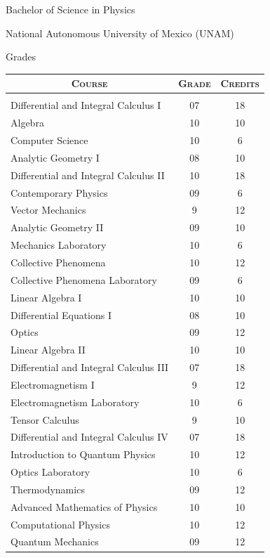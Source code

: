 \documentclass[a4paper,10pt]{article} %
\begin{document}
\newpage
\par{\centering\LARGE \hypertarget{grdsbach}{Bachelor of Science in Physics}\par}\par{\centering\Large National Autonomous University of Mexico (UNAM)\par}\large{\centering Grades\par}\small
\bigskip
\bigskip
\bigskip
\begin{center}
\begin{tabular}{lcc}
\multicolumn{1}{c}{\textsc{Course}} & \textsc{Grade}&\textsc{Credits}\\ \hline \\
Differential and Integral Calculus I & 07 & 18\\
Algebra & 10 & 10\\
Computer Science & 10 & 6\\
Analytic Geometry I & 08 & 10\\
Differential and Integral Calculus II & 10 & 18\\ 
Contemporary Physics & 09 & 6\\
Vector Mechanics & 9 & 12\\ 
Analytic Geometry II & 09 & 10\\
Mechanics Laboratory & 10 & 6\\
Collective Phenomena & 10 & 12\\
Collective Phenomena Laboratory & 09 & 6\\
Linear Algebra I & 10 & 10\\ 
Differential Equations I & 08 & 10\\
Optics & 09 & 12\\
Linear Algebra II & 10 & 10\\
Differential and Integral Calculus III & 07 & 18\\
Electromagnetism I & 9 & 12\\
Electromagnetism Laboratory & 10 & 6\\
Tensor Calculus & 9 & 10\\
Differential and Integral Calculus IV & 07 & 18\\
Introduction to Quantum Physics & 10 & 12\\
Optics Laboratory & 10 & 6\\
Thermodynamics & 09 & 12\\
Advanced Mathematics of Physics & 10 & 10\\
Computational Physics & 10 & 12\\
Quantum Mechanics & 09 & 12\\

\end{tabular}
\end{center}
\end{document}
